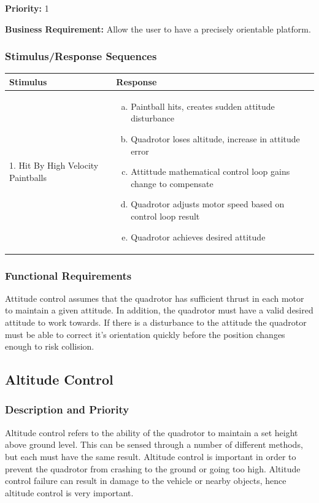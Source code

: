 \documentclass[english]{article}
\numberwithin{equation}{section} %
\begin{document}
\textbf{Priority:} 1

\textbf{Business Requirement:} Allow the user to have a precisely orientable platform.

\subsubsection{Stimulus/Response Sequences}

\begin{longtable}{p{3cm} | p{8.5cm}}
\hline
\textbf{Stimulus} & \textbf{Response}\\
\hline
1. Hit By High Velocity Paintballs &
\begin{enumerate}[(a)]\itemsep1pt %
\item Paintball hits, creates sudden attitude disturbance
\item Quadrotor loses altitude, increase in attitude error
\item Attittude mathematical control loop gains change to compensate
\item Quadrotor adjusts motor speed based on control loop result
\item Quadrotor achieves desired attitude
\end{enumerate}
\\ 
\hline
\end{longtable}
\subsubsection{Functional Requirements}
Attitude control assumes that the quadrotor has sufficient thrust in each motor to maintain a given attitude. In addition, the quadrotor must have a valid desired attitude to work towards. If there is a disturbance to the attitude the quadrotor must be able to correct it's orientation quickly before the position changes enough to risk collision.



\bigskip
\subsection{Altitude Control}
\subsubsection{Description and Priority}
Altitude control refers to the ability of the quadrotor to maintain a set height above ground level. This can be sensed through a number of different methods, but each must have the same result. Altitude control is important in order to prevent the quadrotor from crashing to the ground or going too high. Altitude control failure can result in damage to the vehicle or nearby objects, hence altitude control is very important.
\end{document}
